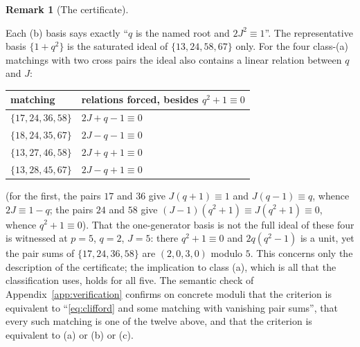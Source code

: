 \documentclass[11pt]{article}
\theoremstyle{definition}
\newtheorem{remark}[theorem]{Remark}
\begin{document}
\begin{remark}[The certificate]
\begin{center}
\end{center}
Each (b) basis says exactly ``$q$ is the named root and $2J^2\equiv1$''.
The representative basis $\{1+q^2\}$ is the saturated ideal of
$\{13,24,58,67\}$ only.  For the four class-(a) matchings with two cross
pairs the ideal also contains a linear relation between $q$ and $J$:
\begin{center}
\begin{tabular}{@{}ll@{}}
\toprule
matching & relations forced, besides $q^2+1\equiv0$\\
\midrule
$\{17,24,36,58\}$ & $2J+q-1\equiv0$\\
$\{18,24,35,67\}$ & $2J-q-1\equiv0$\\
$\{13,27,46,58\}$ & $2J+q+1\equiv0$\\
$\{13,28,45,67\}$ & $2J-q+1\equiv0$\\
\bottomrule
\end{tabular}
\end{center}
(for the first, the pairs $17$ and $36$ give $J(q+1)\equiv1$ and
$J(q-1)\equiv q$, whence $2J\equiv1-q$; the pairs $24$ and $58$ give
$(J-1)(q^2+1)\equiv J(q^2+1)\equiv0$, whence $q^2+1\equiv0$).  That the
one-generator basis is not the full ideal of these four is witnessed at
$p=5$, $q=2$, $J=5$: there $q^2+1\equiv0$ and $2q(q^2-1)$ is a unit, yet
the pair sums of $\{17,24,36,58\}$ are $(2,0,3,0)$ modulo $5$.  This
concerns only the description of the certificate; the implication to
class (a), which is all that the classification uses, holds for all
five.  The semantic check of Appendix~\ref{app:verification} confirms on
concrete moduli that the criterion is equivalent to
``\eqref{eq:clifford} and some matching with vanishing pair sums'', that
every such matching is one of the twelve above, and that the criterion
is equivalent to (a) or (b) or (c).


\end{remark}
\end{document}
